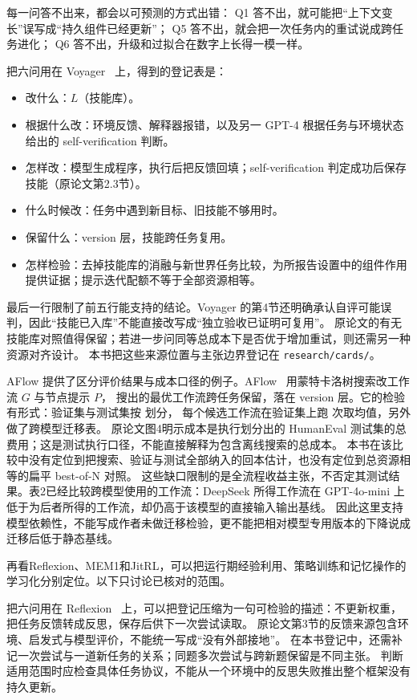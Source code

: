 每一问答不出来，都会以可预测的方式出错：
Q1 答不出，就可能把“上下文变长”误写成“持久组件已经更新”；
Q5 答不出，就会把一次任务内的重试说成跨任务进化；
Q6 答不出，升级和过拟合在数字上长得一模一样。

把六问用在 Voyager~\cite{voyager-2305} 上，得到的登记表是：

\begin{itemize}
  \item 改什么：$L$（技能库）。
  \item 根据什么改：环境反馈、解释器报错，以及另一 GPT-4 根据任务与环境状态给出的 self-verification 判断。
  \item 怎样改：模型生成程序，执行后把反馈回填；self-verification 判定成功后保存技能（原论文第2.3节）。
  \item 什么时候改：任务中遇到新目标、旧技能不够用时。
  \item 保留什么：version 层，技能跨任务复用。
  \item 怎样检验：去掉技能库的消融与新世界任务比较，为所报告设置中的组件作用提供证据；提示迭代配额不等于全部资源相等。
\end{itemize}

最后一行限制了前五行能支持的结论。Voyager 的第4节还明确承认自评可能误判，因此“技能已入库”不能直接改写成“独立验收已证明可复用”。
原论文的有无技能库对照值得保留；若进一步问同等总成本下是否优于增加重试，则还需另一种资源对齐设计。
本书把这些来源位置与主张边界登记在 \texttt{research/cards/}。

AFlow 提供了区分评价结果与成本口径的例子。AFlow~\cite{aflow-2410} 用蒙特卡洛树搜索改工作流 $G$ 与节点提示 $P$，
搜出的最优工作流跨任务保留，落在 version 层。它的检验有形式：验证集与测试集按  划分，
每个候选工作流在验证集上跑  次取均值，另外做了跨模型迁移表。
原论文图4明示成本是执行划分出的 HumanEval 测试集的总费用；这是测试执行口径，不能直接解释为包含离线搜索的总成本。
本书在该比较中没有定位到把搜索、验证与测试全部纳入的回本估计，也没有定位到总资源相等的扁平 best-of-N 对照。
这些缺口限制的是全流程收益主张，不否定其测试结果。表2已经比较跨模型使用的工作流：DeepSeek 所得工作流在 GPT-4o-mini 上低于为后者所得的工作流，却仍高于该模型的直接输入输出基线。
因此这里支持模型依赖性，不能写成作者未做迁移检验，更不能把相对模型专用版本的下降说成迁移后低于静态基线。

再看Reflexion、MEM1和JitRL，可以把运行期经验利用、策略训练和记忆操作的学习化分别定位。以下只讨论已核对的范围。

把六问用在 Reflexion~\cite{reflexion-2303} 上，可以把登记压缩为一句可检验的描述：不更新权重，把任务反馈转成反思，保存后供下一次尝试读取。
原论文第3节的反馈来源包含环境、启发式与模型评价，不能统一写成``没有外部接地''。
在本书登记中，还需补记一次尝试与一道新任务的关系；同题多次尝试与跨新题保留是不同主张。
判断适用范围时应检查具体任务协议，不能从一个环境中的反思失败推出整个框架没有持久更新。

